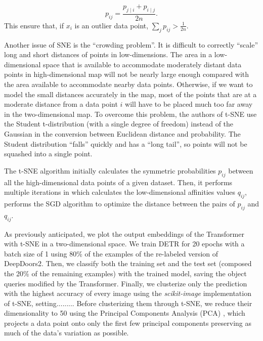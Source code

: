 \begin{equation}
 p_{i j} = \frac{p_{j \mid i} + p_{i \mid j}}{2n}.
\end{equation}
This ensure that, if $x_i$ is an outlier data point, $\sum_{j} p_{i j} > \frac{1}{2n}$.

Another issue of SNE is the ``crowding problem''. It is difficult to correctly ``scale'' long and short distances of points in low-dimensions. The area in a low-dimensional space that is available to accommodate moderately distant
data points in high-dimensional map will not be nearly large enough compared with the area available to accommodate nearby data points. Otherwise, if we want to model the small distances accurately in the map, most of the points that are at a moderate distance from a data point $i$ will have to be placed much too far away in the two-dimensional map. To overcome this problem, the authors of t-SNE use the Student t-distribution (with a single degree of freedom) instead of the Gaussian in the conversion between Euclidean distance and probability. The Student distribution ``falls'' quickly and has a ``long tail'', so points will not be squashed into a single point. 

The t-SNE algorithm initially calculates the symmetric probabilities $p_{i j}$ between all the high-dimensional data points of a given dataset. Then, it performs multiple iterations in which calculates the low-dimensional affinities values $q_{i j}$, performs the SGD algorithm to optimize the distance between the pairs of $p_{i j}$ and $q_{i j}$.

As previously anticipated, we plot the output embeddings of the Transformer with t-SNE in a two-dimensional space. We train DETR for 20 epochs with a batch size of 1 using 80\% of the examples of the re-labeled version of DeepDoors2. Then, we classify both the training set and the test set (composed the 20\% of the remaining examples) with the trained model, saving the object queries modified by the Transformer. Finally, we clusterize only the prediction with the highest accuracy of every image using the \textit{scikit-image} implementation of t-SNE, setting......... Before clusterizing them through t-SNE, we reduce their dimensionality to 50 using the Principal Components Analysis (PCA) \cite{pca}, which projects a data point onto only the first few principal components preserving as much of the data's variation as possible. 


 


